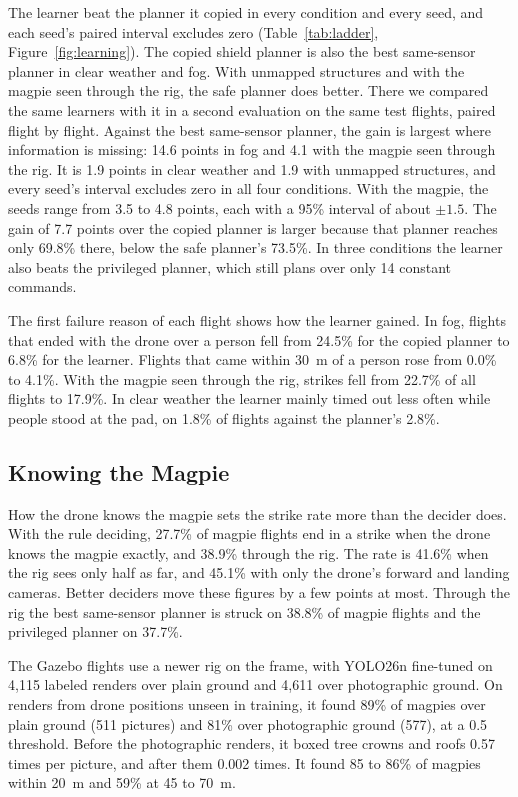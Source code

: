 The learner beat the planner it copied in every condition and every seed, and each seed's paired interval excludes zero (Table~\ref{tab:ladder}, Figure~\ref{fig:learning}). The copied shield planner is also the best same-sensor planner in clear weather and fog. With unmapped structures and with the magpie seen through the rig, the safe planner does better. There we compared the same learners with it in a second evaluation on the same test flights, paired flight by flight. Against the best same-sensor planner, the gain is largest where information is missing: 14.6 points in fog and 4.1 with the magpie seen through the rig. It is 1.9 points in clear weather and 1.9 with unmapped structures, and every seed's interval excludes zero in all four conditions. With the magpie, the seeds range from 3.5 to 4.8 points, each with a 95\% interval of about $\pm 1.5$. The gain of 7.7 points over the copied planner is larger because that planner reaches only 69.8\% there, below the safe planner's 73.5\%. In three conditions the learner also beats the privileged planner, which still plans over only 14 constant commands.

The first failure reason of each flight shows how the learner gained. In fog, flights that ended with the drone over a person fell from 24.5\% for the copied planner to 6.8\% for the learner. Flights that came within 30~m of a person rose from 0.0\% to 4.1\%. With the magpie seen through the rig, strikes fell from 22.7\% of all flights to 17.9\%. In clear weather the learner mainly timed out less often while people stood at the pad, on 1.8\% of flights against the planner's 2.8\%.



\subsection{Knowing the Magpie}

How the drone knows the magpie sets the strike rate more than the decider does. With the rule deciding, 27.7\% of magpie flights end in a strike when the drone knows the magpie exactly, and 38.9\% through the rig. The rate is 41.6\% when the rig sees only half as far, and 45.1\% with only the drone's forward and landing cameras. Better deciders move these figures by a few points at most. Through the rig the best same-sensor planner is struck on 38.8\% of magpie flights and the privileged planner on 37.7\%.

The Gazebo flights use a newer rig on the frame, with YOLO26n \cite{sapkota2025} fine-tuned on 4,115 labeled renders over plain ground and 4,611 over photographic ground. On renders from drone positions unseen in training, it found 89\% of magpies over plain ground (511 pictures) and 81\% over photographic ground (577), at a 0.5 threshold. Before the photographic renders, it boxed tree crowns and roofs 0.57 times per picture, and after them 0.002 times. It found 85 to 86\% of magpies within 20~m and 59\% at 45 to 70~m.

